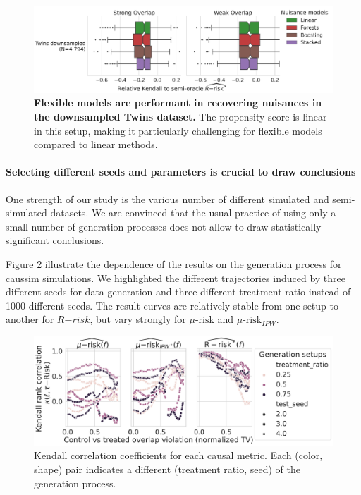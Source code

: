 \documentclass[a4paper,num-refs]{oup-contemporary}%
\begin{document}
\begin{figure}
    \centering
    \includegraphics[width=\textwidth]{_4_nuisance_models_r_risk_only_twins_nuisances.pdf}
    \hfill
    \caption{\textbf{Flexible models are performant in recovering nuisances
            in the downsampled Twins dataset.} The propensity score is linear in this
        setup, making it particularly challenging for flexible models compared to
        linear methods.}\label{apd:fig:nuisances_comparison_twins}
\end{figure}


\paragraph{Selecting different seeds and parameters is crucial to draw
    conclusions}\label{apd:results:seed_effect}

One strength of our study is the various number of different simulated and
semi-simulated datasets. We are convinced that the usual practice of using only
a small number of generation processes does not allow to draw statistically
significant conclusions.

Figure \ref{apd:results:fig:seed_effect} illustrate the dependence of the
results on the generation process for caussim simulations. We highlighted the
different trajectories induced by three different seeds for data generation and
three different treatment ratio instead of 1000 different seeds. The result
curves are relatively stable from one setup to another for $R{-risk}$, but vary
strongly for $\mu\text{-risk}$ and $\mu\text{-risk}_{IPW}$.

\begin{figure}
    \centering
    \caption{Kendall correlation coefficients for each causal metric. Each (color,
        shape) pair indicates a different (treatment ratio, seed) of the generation
        process.}\label {apd:results:fig:seed_effect}
    \includegraphics[width=\linewidth]{caussim_seed_effect.pdf}
\end{figure}
\end{document}
